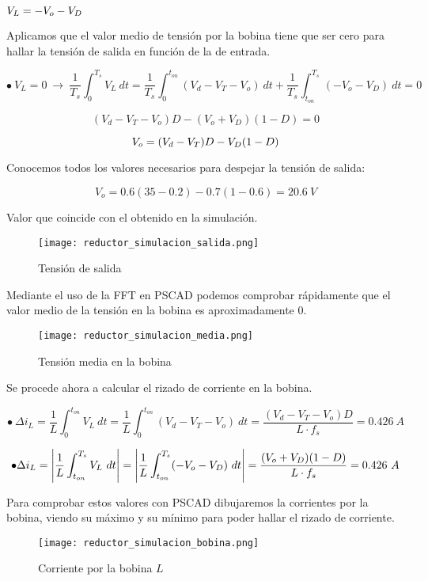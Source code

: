 \documentclass[10pt]{article}
\begin{document}
	$V_L = -V_o - V_D\bigskip$
	
	Aplicamos que el valor medio de tensión por la bobina tiene que ser cero para hallar la tensión de salida en función de la de entrada.
	
	$$\bullet\ V_L=0\ \rightarrow\ \frac{1}{T_s}\int_{0}^{T_s}V_L\ dt= \frac{1}{T_s}\int_{0}^{t_{on}}(V_d-V_T-V_o)\ dt + \frac{1}{T_s}\int_{t_{on}}^{T_s}(-V_o-V_D)\ dt=0$$
	
	$$(V_d-V_T-V_o)D - (V_o+V_D)(1-D) = 0$$
	
	$$V_o=(V_d-V_T)D-V_D(1-D)\bigskip$$
	
	Conocemos todos los valores necesarios para despejar la tensión de salida:
	
	$$V_o=0.6(35-0.2)-0.7(1-0.6)= 20.6\ V$$
	
	Valor que coincide con el obtenido en la simulación.
	
	\begin{figure}[H]
		\begin{center}
			\texttt{[image: reductor\_simulacion\_salida.png]}
		\end{center}\caption{Tensión de salida}
	\end{figure}

	Mediante el uso de la FFT en PSCAD podemos comprobar rápidamente que el valor medio de la tensión en la bobina es aproximadamente 0.
	
	\begin{figure}[H]
		\begin{center}
			\texttt{[image: reductor\_simulacion\_media.png]}
		\end{center}\caption{Tensión media en la bobina}
	\end{figure}
	
	Se procede ahora a calcular el rizado de corriente en la bobina.
	
	$$\bullet\ \Delta{i_L}=\frac{1}{L}\int_{0}^{t_{on}}V_L\ dt=\frac{1}{L}\int_{0}^{t_{on}}(V_d-V_T-V_o)\ dt= \frac{(V_d-V_T-V_o)D}{L\cdot f_s}= 0.426\ A$$
	
	$$\bullet \Delta{i_L}= \left|\frac{1}{L}\int_{t_{on}}^{T_s}V_L\ dt\right|=\left|\frac{1}{L}\int_{t_{on}}^{T_s}(-V_o-V_D)\ dt\right|= \frac{(V_o+V_D)(1-D)}{L\cdot f_s}=0.426\ A\bigskip$$
	
	Para comprobar estos valores con PSCAD dibujaremos la corrientes por la bobina, viendo su máximo y su mínimo para poder hallar el rizado de corriente.
	
	\begin{figure}[H]
		\begin{center}
			\texttt{[image: reductor\_simulacion\_bobina.png]}
		\end{center}\caption{Corriente por la bobina $L$}
	\end{figure}
	
\end{document}
